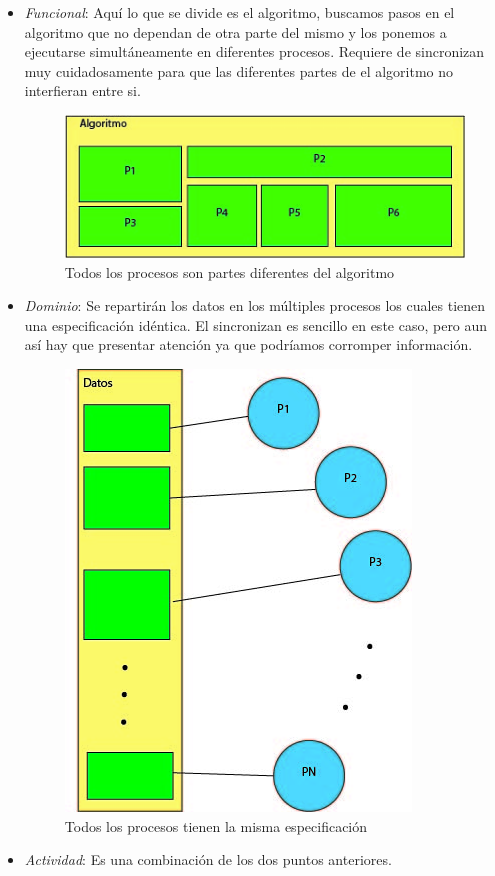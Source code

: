 \begin{itemize}
 
	\item \textit{Funcional}: Aquí lo que se divide es el algoritmo, buscamos pasos en el algoritmo que no dependan de otra parte del mismo y los ponemos a ejecutarse simultáneamente en diferentes procesos. Requiere de sincronizan muy cuidadosamente para que las diferentes partes de el algoritmo no interfieran entre si. 
	
	\begin{figure}[h]
			\centering
				\includegraphics[scale=0.7]{img/funcional.jpg}
			\caption{Todos los procesos son partes diferentes del algoritmo}
	\end{figure}

	\item \textit{Dominio}: Se repartirán los datos en los múltiples procesos los cuales tienen una especificación idéntica. El sincronizan es sencillo en este caso, pero aun así hay que presentar atención ya que podríamos corromper información.
	\begin{figure}[h]
			\centering
				\includegraphics[scale=0.6]{img/dominio.jpg}
			\caption{Todos los procesos tienen la misma especificación }
	\end{figure}

	\item 	\textit{Actividad}: Es una combinación de los dos puntos anteriores.
\end{itemize}

